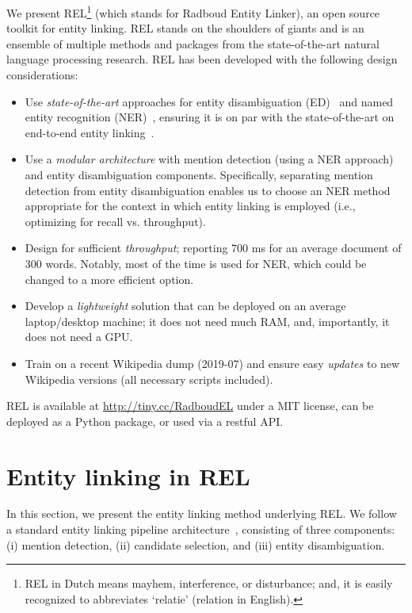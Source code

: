 \documentclass[sigconf]{acmart}
\begin{document}
We present REL\footnote{REL in Dutch means mayhem, interference, or
  disturbance; and, it is easily recognized to abbreviates `relatie' (relation in English).}
 (which stands for Radboud Entity Linker), an open source toolkit for entity linking. 
REL stands on the shoulders of giants and is an ensemble of multiple methods and packages from the state-of-the-art natural language processing research. REL has been developed with the following design considerations:
\begin{itemize}[leftmargin=3mm]
	\item Use \emph{state-of-the-art} approaches for entity disambiguation (ED)~\cite{Le:2018:IEL, Ganea:2017:DJE} and named entity recognition (NER)~\cite{Akbik:2018:flair}, ensuring it is on par with the state-of-the-art on end-to-end entity linking~\citep{Kolitsas:2018:ENE}.
	\item Use a \emph{modular architecture} with mention detection (using a NER approach) and entity disambiguation components. Specifically, separating mention detection from entity disambiguation enables us to choose an NER method appropriate for the context in which entity linking is employed (i.e., optimizing for recall vs. throughput). \item Design for sufficient \emph{throughput}; reporting 700 ms for an average document of 300 words.  Notably, most of the time is used for NER, which could be changed to a more efficient option.\item Develop a \emph{lightweight} solution that can be deployed on an average laptop/desktop machine; it does not need much RAM, and, importantly, it does not need a GPU.  \item Train on a recent Wikipedia dump (2019-07) and ensure easy \emph{updates} to new Wikipedia versions (all necessary scripts included).  \end{itemize}
REL is available at \url{http://tiny.cc/RadboudEL} under a MIT license, can be deployed as a Python package, or used via a restful API.

 \section{Entity linking in REL} 
\label{sec:approach}
In this section, we present the entity linking method underlying REL.  We follow a standard entity linking pipeline architecture~\citep{Balog:2018:EOS}, consisting of three components: (i) mention detection, (ii) candidate selection, and (iii) entity disambiguation.
\end{document}
